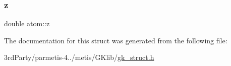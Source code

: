 \mbox{\label{structatom_ac42f4b22143f6cda6bd26bfa01896a65}} 
\subsubsection{\texorpdfstring{z}{z}}
{\footnotesize\ttfamily double atom\+::z}



The documentation for this struct was generated from the following file\+:\begin{DoxyCompactItemize}
\item 
3rd\+Party/parmetis-\/4../metis/\+G\+Klib/\hyperlink{gk__struct_8h}{gk\+\_\+struct.\+h}\end{DoxyCompactItemize}
